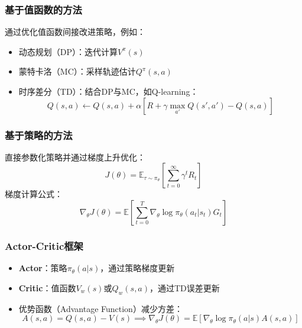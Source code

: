 \subsubsection{基于值函数的方法}
通过优化值函数间接改进策略，例如：
\begin{itemize}
  \item 动态规划（DP）：迭代计算$V^\pi(s)$
  \item 蒙特卡洛（MC）：采样轨迹估计$Q^\pi(s,a)$
  \item 时序差分（TD）：结合DP与MC，如Q-learning：
  \[
  Q(s,a) \leftarrow Q(s,a) + \alpha \left[ R + \gamma \max_{a'} Q(s',a') - Q(s,a) \right]
  \]
\end{itemize}

\subsubsection{基于策略的方法}
直接参数化策略并通过梯度上升优化：
\[
J(\theta) = \mathbb{E}_{\tau \sim \pi_\theta} \left[ \sum_{t=0}^\infty \gamma^t R_t \right]
\]
梯度计算公式：
\[
\nabla_\theta J(\theta) = \mathbb{E} \left[ \sum_{t=0}^T \nabla_\theta \log \pi_\theta(a_t|s_t) G_t \right]
\]

\subsubsection{Actor-Critic框架}
\begin{itemize}
  \item \textbf{Actor}：策略$\pi_\theta(a|s)$，通过策略梯度更新
  \item \textbf{Critic}：值函数$V_w(s)$或$Q_w(s,a)$，通过TD误差更新
  \item 优势函数（Advantage Function）减少方差：
  \[
  A(s,a) = Q(s,a) - V(s) \implies \nabla_\theta J(\theta) = \mathbb{E} \left[ \nabla_\theta \log \pi_\theta(a|s) A(s,a) \right]
  \]
\end{itemize}
